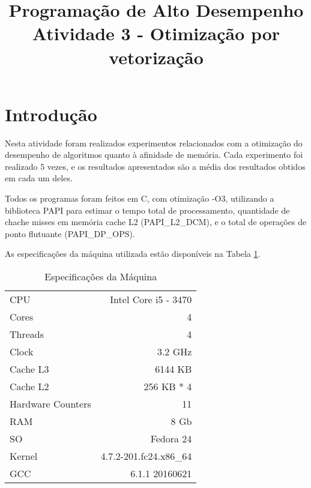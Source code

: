 \documentclass[conference]{IEEEtran}
\begin{document}
\title{Programação de Alto Desempenho\\
\large Atividade 3 - Otimização por vetorização}

\author{
 }

\maketitle


\section{Introdução}
Nesta atividade foram realizados experimentos relacionados com a otimização do desempenho de algoritmos quanto à afinidade de memória.
Cada experimento foi realizado 5 vezes, e os resultados apresentados são a média dos resultados obtidos em cada um deles.

Todos os programas foram feitos em C, com otimização -O3, utilizando a biblioteca PAPI para estimar o tempo total de processamento, quantidade de chache misses em memória cache L2 (PAPI\_L2\_DCM), e o total de operações de ponto flutuante (PAPI\_DP\_OPS).


As especificações da máquina utilizada estão disponíveis na Tabela \ref{tab:cpu}.

\begin{table}[htb!]
\centering
\caption{Especificações da Máquina}
\label{tab:cpu}
\begin{tabular}{lr}
 CPU & Intel Core i5 - 3470\\
 Cores & 4\\
 Threads & 4\\
 Clock & 3.2 GHz\\
 Cache L3 & 6144 KB \\
 Cache L2 & 256 KB * 4 \\
 Hardware Counters & 11 \\
 RAM & 8 Gb \\
 SO & Fedora 24 \\
 Kernel & 4.7.2-201.fc24.x86\_64 \\
 GCC & 6.1.1 20160621\\

\end{tabular}
\end{table}
\end{document}
